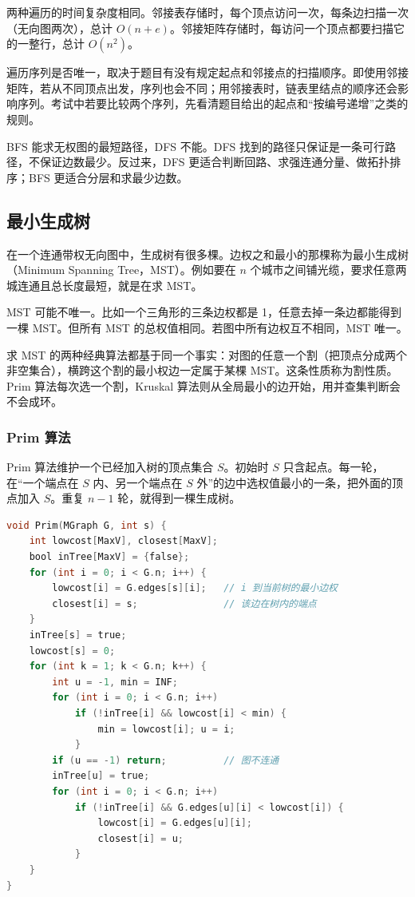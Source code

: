 两种遍历的时间复杂度相同。邻接表存储时，每个顶点访问一次，每条边扫描一次（无向图两次），总计 $O(n+e)$。邻接矩阵存储时，每访问一个顶点都要扫描它的一整行，总计 $O(n^2)$。

遍历序列是否唯一，取决于题目有没有规定起点和邻接点的扫描顺序。即使用邻接矩阵，若从不同顶点出发，序列也会不同；用邻接表时，链表里结点的顺序还会影响序列。考试中若要比较两个序列，先看清题目给出的起点和“按编号递增”之类的规则。

\begin{attention}
BFS 能求无权图的最短路径，DFS 不能。DFS 找到的路径只保证是一条可行路径，不保证边数最少。反过来，DFS 更适合判断回路、求强连通分量、做拓扑排序；BFS 更适合分层和求最少边数。
\end{attention}

\subsection{最小生成树}

在一个连通带权无向图中，生成树有很多棵。边权之和最小的那棵称为最小生成树（Minimum Spanning Tree，MST）。例如要在 $n$ 个城市之间铺光缆，要求任意两城连通且总长度最短，就是在求 MST。

MST 可能不唯一。比如一个三角形的三条边权都是 1，任意去掉一条边都能得到一棵 MST。但所有 MST 的总权值相同。若图中所有边权互不相同，MST 唯一。

求 MST 的两种经典算法都基于同一个事实：对图的任意一个割（把顶点分成两个非空集合），横跨这个割的最小权边一定属于某棵 MST。这条性质称为割性质。Prim 算法每次选一个割，Kruskal 算法则从全局最小的边开始，用并查集判断会不会成环。

\subsubsection{Prim 算法}

Prim 算法维护一个已经加入树的顶点集合 $S$。初始时 $S$ 只含起点。每一轮，在“一个端点在 $S$ 内、另一个端点在 $S$ 外”的边中选权值最小的一条，把外面的顶点加入 $S$。重复 $n-1$ 轮，就得到一棵生成树。

\begin{lstlisting}[language=C]
void Prim(MGraph G, int s) {
    int lowcost[MaxV], closest[MaxV];
    bool inTree[MaxV] = {false};
    for (int i = 0; i < G.n; i++) {
        lowcost[i] = G.edges[s][i];   // i 到当前树的最小边权
        closest[i] = s;               // 该边在树内的端点
    }
    inTree[s] = true;
    lowcost[s] = 0;
    for (int k = 1; k < G.n; k++) {
        int u = -1, min = INF;
        for (int i = 0; i < G.n; i++)
            if (!inTree[i] && lowcost[i] < min) {
                min = lowcost[i]; u = i;
            }
        if (u == -1) return;          // 图不连通
        inTree[u] = true;
        for (int i = 0; i < G.n; i++)
            if (!inTree[i] && G.edges[u][i] < lowcost[i]) {
                lowcost[i] = G.edges[u][i];
                closest[i] = u;
            }
    }
}
\end{lstlisting}

